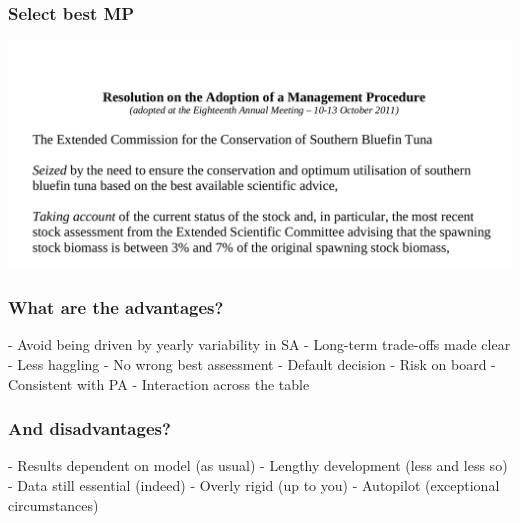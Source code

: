 \documentclass{beamer}\usepackage[]{graphicx}\usepackage[]{xcolor}
\begin{document}
\begin{frame}
\frametitle{Select best MP}

\begin{center}
\includegraphics[height=0.95\textheight]{figs/mp.png}
\end{center}

\end{frame}

\begin{frame}
\frametitle{What are the advantages?}

- Avoid being driven by yearly variability in SA
- Long-term trade-offs made clear
- Less haggling
- No wrong best assessment
- Default decision
- Risk on board
- Consistent with PA
- Interaction across the table

\end{frame}

\begin{frame}
\frametitle{And disadvantages?}

- Results dependent on model (as usual)
- Lengthy development (less and less so)
- Data still essential (indeed)
- Overly rigid (up to you)
- Autopilot (exceptional circumstances)

\end{frame}
\end{document}
